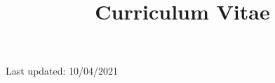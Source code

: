 \documentclass[a4paper,10pt]{curve}
\title{Curriculum Vitae}
\begin{document}
            \makeheaders[t]
            \maketitle
            \begin{center}
Last updated: 10/04/2021
\end{center}
            
\end{document}
